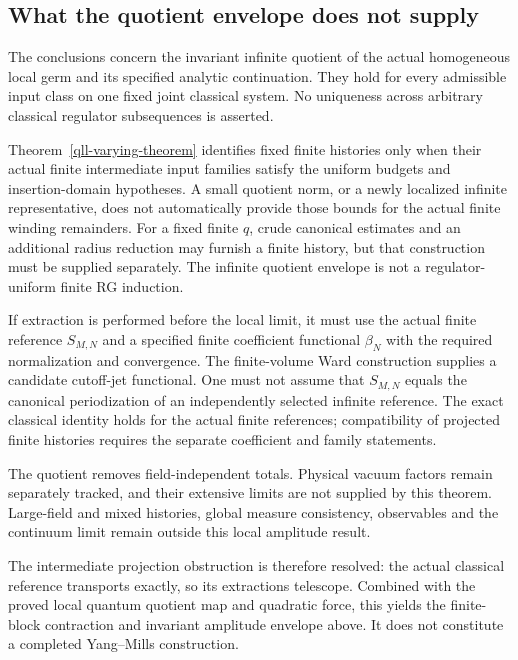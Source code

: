 \documentclass[11pt]{article}
\theoremstyle{remark}
\begin{document}
\subsection{What the quotient envelope does not supply}
\label{eqr-scope-section}

The conclusions concern the invariant infinite quotient of
the actual homogeneous local germ and its specified analytic
continuation. They hold for every admissible input class
on one fixed joint classical system. No uniqueness across
arbitrary classical regulator subsequences is asserted.

Theorem~\ref{qll-varying-theorem} identifies fixed finite
histories only when their actual finite intermediate input
families satisfy the uniform budgets and insertion-domain
hypotheses. A small quotient norm, or a newly localized
infinite representative, does not automatically provide those
bounds for the actual finite winding remainders. For a fixed
finite $q$, crude canonical estimates and an additional radius
reduction may furnish a finite history, but that construction
must be supplied separately. The infinite quotient envelope
is not a regulator-uniform finite RG induction.

If extraction is performed before the local limit, it must
use the actual finite reference $S_{M,N}$ and a specified
finite coefficient functional $\beta_N$ with the required
normalization and convergence. The finite-volume Ward
construction supplies a candidate cutoff-jet functional.
One must not assume that $S_{M,N}$ equals the canonical
periodization of an independently selected infinite reference.
The exact classical identity holds for the actual finite
references; compatibility of projected finite histories
requires the separate coefficient and family statements.

The quotient removes field-independent totals. Physical
vacuum factors remain separately tracked, and their
extensive limits are not supplied by this theorem.
Large-field and mixed histories, global measure consistency,
observables and the continuum limit remain outside this
local amplitude result.

The intermediate projection obstruction is therefore resolved:
the actual classical reference transports exactly, so its
extractions telescope. Combined with the proved local quantum
quotient map and quadratic force, this yields the finite-block
contraction and invariant amplitude envelope above. It does
not constitute a completed Yang--Mills construction.
\end{document}

